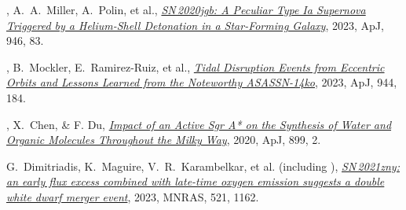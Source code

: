 


\begin{cvpubs}


\cvpub
{ %
\begin{cvitems}
\item {{\bf \color{darktext}{C.~Liu}}, A.~A.~Miller, A.~Polin, et al., \href{https://iopscience.iop.org/article/10.3847/1538-4357/acbb5e/meta}{\textit{SN\,2020jgb: A Peculiar Type Ia Supernova Triggered by a Helium-Shell Detonation in a Star-Forming Galaxy}}, 2023, ApJ, 946, 83.}
\item {{\bf \color{darktext}{C.~Liu}}, B.~Mockler, E.~Ramirez-Ruiz, et al., \href{https://iopscience.iop.org/article/10.3847/1538-4357/acafe1}{\textit{Tidal Disruption Events from Eccentric Orbits and Lessons Learned from the Noteworthy ASASSN-14ko}}, 2023, ApJ, 944, 184.}
\item {{\bf \color{darktext}{C.~Liu}}, X.~Chen, \& F. Du, \href{https://iopscience.iop.org/article/10.3847/1538-4357/aba758}{\textit{Impact of an Active Sgr A* on the Synthesis of Water and Organic Molecules Throughout the Milky Way}}, 2020, ApJ, 899, 2.}
\item {G.~Dimitriadis, K.~Maguire, V.~R.~Karambelkar, et al. (including {\bf \color{darktext}{C.~Liu}}), \href{https://academic.oup.com/mnras/article-abstract/521/1/1162/7059222?redirectedFrom=fulltext}{\textit{SN\,2021zny: an early flux excess combined with late-time oxygen emission suggests a double white dwarf merger event}}, 2023, MNRAS, 521, 1162.}
\end{cvitems}
}


\end{cvpubs}